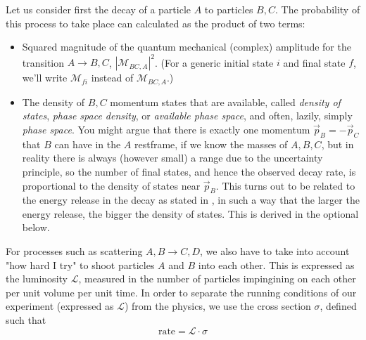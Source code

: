 Let us consider first the decay of a particle $A$ to particles $B, C$. The probability of this process to take place can calculated as the product of two terms:
\begin{itemize}
\item Squared magnitude of the quantum mechanical (complex) amplitude for the transition $A\to B, C$, $\left|\mathcal{M}_{BC,A}\right|^2$. (For a generic initial state $i$ and final state $f$, we'll write $\mathcal{M}_{fi}$ instead of $\mathcal{M}_{BC,A}$.)
\item The density of $B, C$ momentum states that are available, called \emph{density of states}, \emph{phase space density}, or \emph{available phase space}, and often, lazily, simply \emph{phase space}. You might argue that there is exactly one momentum $\vec{p}_B = -\vec{p}_C$ that $B$ can have in the $A$ restframe, if we know the masses of $A, B, C$, but in reality there is always (however small) a range due to the uncertainty principle, so the number of final states, and hence the observed decay rate, is proportional to the density of states near $\vec{p}_B$. This turns out to be related to the energy release in the decay as stated in , in such a way that the larger the energy release, the bigger the density of states. This is derived in the optional  below.
\end{itemize}

For processes such as scattering $A, B \to C, D$, we also have to take into account "how hard I try" to shoot particles $A$ and $B$ into each other. This is expressed as the luminosity $\mathcal{L}$, measured in the number of particles impingining on each other per unit volume per unit time. In order to separate the running conditions of our experiment (expressed as $\mathcal{L}$) from the physics, we use the cross section $\sigma$, defined such that 
\begin{equation}
\mathrm{rate} = \mathcal{L} \cdot \sigma
\end{equation}

